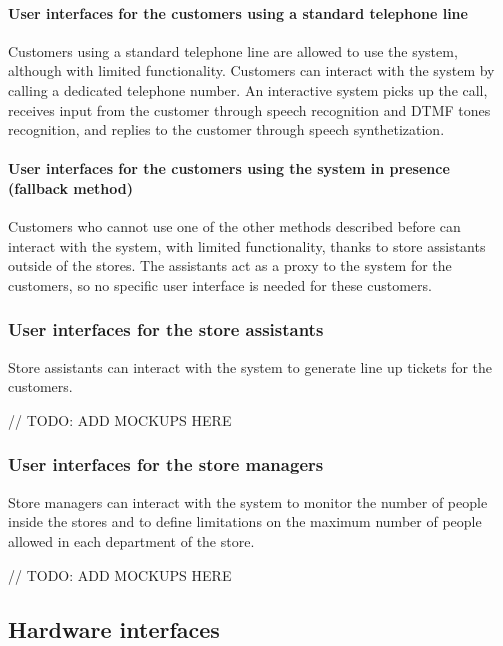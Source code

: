 \documentclass[../../main.tex]{subfiles}
\begin{document}
  \pagebreak

  \paragraph{User interfaces for the customers using a standard telephone line}

  Customers using a standard telephone line are allowed to use the system,
  although with limited functionality. Customers can interact with the system by
  calling a dedicated telephone number. An interactive system picks up the call,
  receives input from the customer through speech recognition and DTMF tones
  recognition, and replies to the customer through speech synthetization.

  \paragraph{User interfaces for the customers using the system in presence (fallback method)}

  Customers who cannot use one of the other methods described before can
  interact with the system, with limited functionality, thanks to store
  assistants outside of the stores. The assistants act as a proxy to the system
  for the customers, so no specific user interface is needed for these
  customers.

  \subsubsection{User interfaces for the store assistants}

  Store assistants can interact with the system to generate line up tickets for
  the customers.

  // TODO: ADD MOCKUPS HERE

  \subsubsection{User interfaces for the store managers}

  Store managers can interact with the system to monitor the number of people
  inside the stores and to define limitations on the maximum number of people
  allowed in each department of the store.

  // TODO: ADD MOCKUPS HERE

\subsection{Hardware interfaces}
\end{document}
